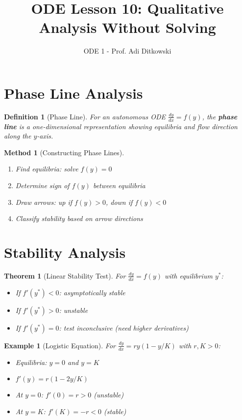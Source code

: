 \documentclass[12pt]{article}
\title{ODE Lesson 10: Qualitative Analysis Without Solving}
\author{ODE 1 - Prof. Adi Ditkowski}
\date{}
\newtheorem{definition}{Definition}
\newtheorem{theorem}{Theorem}
\newtheorem{method}{Method}
\newtheorem{example}{Example}
\begin{document}
\maketitle

\section{Phase Line Analysis}

\begin{definition}[Phase Line]
For an autonomous ODE $\frac{dy}{dx} = f(y)$, the \textbf{phase line} is a one-dimensional representation showing equilibria and flow direction along the $y$-axis.
\end{definition}

\begin{method}[Constructing Phase Lines]
\begin{enumerate}
    \item Find equilibria: solve $f(y) = 0$
    \item Determine sign of $f(y)$ between equilibria
    \item Draw arrows: up if $f(y) > 0$, down if $f(y) < 0$
    \item Classify stability based on arrow directions
\end{enumerate}
\end{method}

\section{Stability Analysis}

\begin{theorem}[Linear Stability Test]
For $\frac{dy}{dx} = f(y)$ with equilibrium $y^*$:
\begin{itemize}
    \item If $f'(y^*) < 0$: asymptotically stable
    \item If $f'(y^*) > 0$: unstable
    \item If $f'(y^*) = 0$: test inconclusive (need higher derivatives)
\end{itemize}
\end{theorem}

\begin{example}[Logistic Equation]
For $\frac{dy}{dx} = ry(1 - y/K)$ with $r, K > 0$:
\begin{itemize}
    \item Equilibria: $y = 0$ and $y = K$
    \item $f'(y) = r(1 - 2y/K)$
    \item At $y = 0$: $f'(0) = r > 0$ (unstable)
    \item At $y = K$: $f'(K) = -r < 0$ (stable)
\end{itemize}
\end{example}
\end{document}
